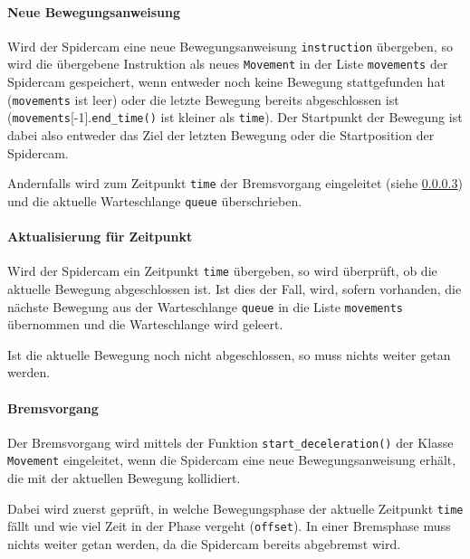 \paragraph{Neue Bewegungsanweisung}
\label{sssec:neue_bewegungsanweisung}
Wird der Spidercam eine neue Bewegungsanweisung \texttt{instruction} übergeben, so wird die übergebene Instruktion als neues \texttt{Movement} in der Liste \texttt{movements} der Spidercam gespeichert, wenn entweder noch keine Bewegung stattgefunden hat (\texttt{movements} ist leer) oder die letzte Bewegung bereits abgeschlossen ist (\texttt{movements}[-1].\texttt{end\_time()} ist kleiner als \texttt{time}).
Der Startpunkt der Bewegung ist dabei also entweder das Ziel der letzten Bewegung oder die Startposition der Spidercam.

Andernfalls wird zum Zeitpunkt \texttt{time} der Bremsvorgang eingeleitet (siehe \ref{sssec:bremsvorgang}) und die aktuelle Warteschlange \texttt{queue} überschrieben.

\paragraph{Aktualisierung für Zeitpunkt}
\label{sssec:aktualisierung_fuer_zeitpunkt}

Wird der Spidercam ein Zeitpunkt \texttt{time} übergeben, so wird überprüft, ob die aktuelle Bewegung abgeschlossen ist.
Ist dies der Fall, wird, sofern vorhanden, die nächste Bewegung aus der Warteschlange \texttt{queue} in die Liste \texttt{movements} übernommen und die Warteschlange wird geleert.

Ist die aktuelle Bewegung noch nicht abgeschlossen, so muss nichts weiter getan werden.

\paragraph{Bremsvorgang}
\label{sssec:bremsvorgang}

Der Bremsvorgang wird mittels der Funktion \texttt{start\_deceleration()} der Klasse \texttt{Movement} eingeleitet, wenn die Spidercam eine neue Bewegungsanweisung erhält, die mit der aktuellen Bewegung kollidiert.

Dabei wird zuerst geprüft, in welche Bewegungsphase der aktuelle Zeitpunkt \texttt{time} fällt und wie viel Zeit in der Phase vergeht (\texttt{offset}).
In einer Bremsphase muss nichts weiter getan werden, da die Spidercam bereits abgebremst wird.

